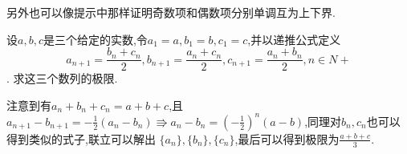 \documentclass{exam}
\begin{document}
\begin{questions}
\begin{solution}
        另外也可以像提示中那样证明奇数项和偶数项分别单调互为上下界.
    \end{solution}

    \question
    设$a,b,c$是三个给定的实数,令$a_1=a,b_1=b,c_1=c$,并以递推公式定义
    \[a_{n+1}=\frac{b_n+c_n}{2},b_{n+1}=\frac{a_n+c_n}{2},c_{n+1}=\frac{a_n+b_n}{2},n\in N+\].
    求这三个数列的极限.
    \begin{solution}
        注意到有$a_n+b_n+c_n=a+b+c$,且$a_{n+1}-b_{n+1}=-\frac{1}{2}(a_n-b_n)\Rrightarrow
        a_n-b_n=\left(-\frac{1}{2}\right)^n(a-b)$,同理对$b_n,c_n$也可以得到类似的式子,联立可以解出
        $\{a_n\},\{b_n\},\{c_n\}$,最后可以得到极限为$\frac{a+b+c}{3}$.
    \end{solution}

    \question

\end{questions}
\end{document}
